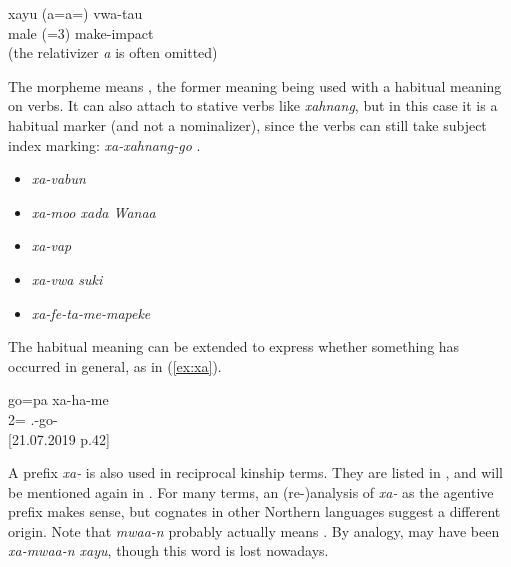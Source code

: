 	\ea \label{ex:xavwatau}
		\gll xayu (a=a=) vwa-tau\\
	 male (=3) make-impact\\
	\glt {} (the relativizer \textit{a} is often omitted)
		\z

The morpheme means , the former meaning being used with a habitual meaning on verbs. It can also attach to stative verbs like \textit{xahnang}, but in this case it is a habitual marker (and not a nominalizer), since the verbs can still take subject index marking: \textit{xa-xahnang-go} . %

\begin{itemize}
	\item \textit{xa-vabun} 
	\item \textit{xa-moo xada Wanaa} 
	\item	\textit{xa-vap} 
	\item	\textit{xa-vwa suki} 
	\item	\textit{xa-fe-ta-me-mapeke} 
\end{itemize}


The habitual meaning can be extended to express whether something has occurred in general, as in (\ref{ex:xa}).

\ea \label{ex:xa}
\gll go=pa xa-ha-me\\
 2= .-go-\\
\glt {} {[21.07.2019 p.42]}
\z


A prefix \textit{xa-} is also used in reciprocal kinship terms. They are listed in , and will be mentioned again in . For many terms, an (re-)anal\-y\-sis of \textit{xa-} as the agentive prefix makes sense, but cognates in other Northern languages suggest a different origin. Note that \textit{mwaa-n} probably actually means . By analogy,  may have been \textit{xa-mwaa-n xayu}, though this word is lost nowadays.

